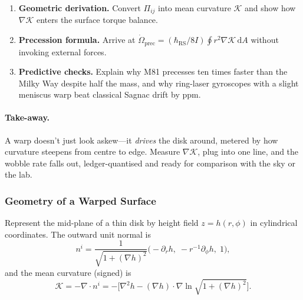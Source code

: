 \documentclass[11pt,oneside]{book}
\begin{document}
\begin{enumerate}[label=\arabic*.,leftmargin=*,itemsep=3pt]
\item \textbf{Geometric derivation.}  
      Convert \(\Pi_{ij}\) into mean curvature \(\mathcal K\) and
      show how \(\nabla\mathcal K\) enters the surface torque
      balance.
\item \textbf{Precession formula.}  
      Arrive at
      \(\displaystyle
        \dot{\Omega}_{\mathrm{prec}}
        = (\hbar_{\mathrm{RS}}/8I)\oint r^{2}\nabla\mathcal K\,\mathrm dA\)
      without invoking external forces.
\item \textbf{Predictive checks.}  
      Explain why M81 precesses ten times faster than the Milky Way
      despite half the mass, and why ring-laser gyroscopes with a
      slight meniscus warp beat classical Sagnac drift by ppm.
\end{enumerate}

\paragraph{Take-away.}
A warp doesn’t just look askew—it \emph{drives} the disk around,
metered by how curvature steepens from centre to edge.  Measure
\(\nabla\mathcal K\), plug into one line, and the wobble rate
falls out, ledger-quantised and ready for comparison with the sky or
the lab.



\subsubsection{Geometry of a Warped Surface}
\label{ss:warp-geom}

Represent the mid-plane of a thin disk by height field
$z=h(r,\phi)$ in cylindrical coordinates.
The outward unit normal is
\[
   n^{i}
   = \frac{1}{\sqrt{1+(\nabla h)^2}}
     \bigl(\!-\partial_{r}h,\;
            -r^{-1}\partial_{\phi}h,\;
            1\bigr),
\]
and the mean curvature (signed) is
\begin{equation}
   \mathcal K
   = -\nabla\!\cdot\! n^{i}
   = -\bigl[\nabla^{2}h
            -(\nabla h)\!\cdot\!\nabla
               \ln\!\sqrt{1+(\nabla h)^2}\bigr].
   \label{eq:mean-curv}
\end{equation}
\end{document}
